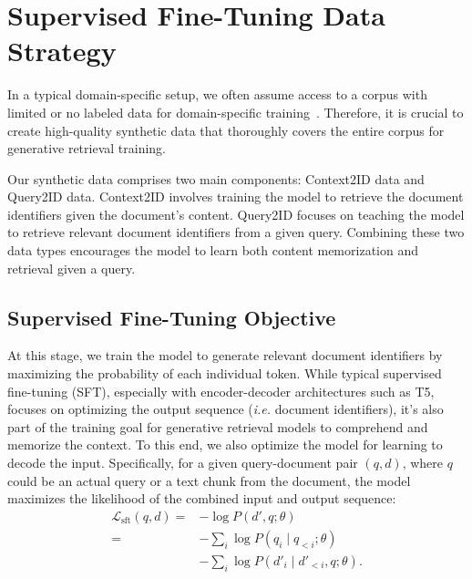 \section{Supervised Fine-Tuning Data Strategy}
In a typical domain-specific setup, we often assume access to a corpus with limited or no labeled data for domain-specific training~\citep{DBLP:conf/ictir/HashemiZKPMC23}. Therefore, it is crucial to create high-quality synthetic data that thoroughly covers the entire corpus for generative retrieval training.

Our synthetic data comprises two main components: Context2ID data and Query2ID data. Context2ID involves training the model to retrieve the document identifiers given the document's content. Query2ID focuses on teaching the model to retrieve relevant document identifiers from a given query.
Combining these two data types encourages the model to learn both content memorization and retrieval given a query.

\subsection{Supervised Fine-Tuning Objective}
At this stage, we train the model to generate relevant document identifiers by maximizing the probability of each individual token. While typical supervised fine-tuning (SFT), especially with encoder-decoder architectures such as T5, focuses on optimizing the output sequence (\textit{i.e.} document identifiers), it's also part of the training goal for generative retrieval models to comprehend and memorize the context. To this end, we also optimize the model for learning to decode the input.
Specifically, for a given query-document pair $(q,d)$, where $q$ could be an actual query or a text chunk from the document, the model maximizes the likelihood of the combined input and output sequence:
\begin{align*}
\mathcal{L}_\text{sft}\left(q,d\right) = &-\log P\left(d', q; \theta\right) \\
= &-\sum_i \log P(q_i \mid q_{<i}; \theta) \\
 &- \sum_i \log P(d'_i \mid d'_{<i}, q; \theta).
\end{align*}

